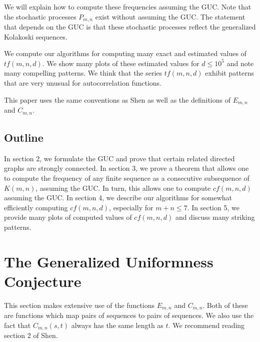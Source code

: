 \documentclass[11pt]{amsart} %
\begin{document}
We will explain how to compute these frequencies assuming the GUC. Note that the stochastic processes $P_{m,n}$ exist without assuming the GUC. The statement that depends on the GUC is that these stochastic processes reflect the generalized Kolakoski sequences. 

We compute our algorithms for computing many exact and estimated values of $tf(m,n,d).$ We show many plots of these estimated values for $d \le 10^5$ and note many compelling patterns. We think that the series $tf(m,n,d)$ exhibit patterns that are very unusual for autocorrelation functions. 


This paper uses the same conventions as Shen\cite{Shen} as well as the definitions of $E_{m, n}$ and $C_{m, n}.$ 

\subsection{Outline}
In section 2, we formulate the GUC and prove that certain related directed graphs are strongly connected. In section 3, we prove a theorem that allows one to compute the frequency of any finite sequence as a consecutive subsequence of $K(m, n)$, assuming the GUC. In turn, this allows one to compute $cf(m, n, d)$ assuming the GUC. In section 4, we describe our algorithms for somewhat efficiently computing $cf(m,n,d)$, especially for $m+n \le 7.$  In section 5, we provide many plots of computed values of $cf(m, n, d)$ and discuss many striking patterns.

\section{The Generalized Uniformness Conjecture}\label{sec-guc}
This section makes extensive use of the functions $E_{m, n}$ and $C_{m, n}$. Both of these are functions which map pairs of sequences to pairs of sequences. We also use the fact that $C_{m, n}(s, t)$ always has the same length as $t.$ We recommend reading section 2 of Shen\cite{Shen}.
\end{document}
